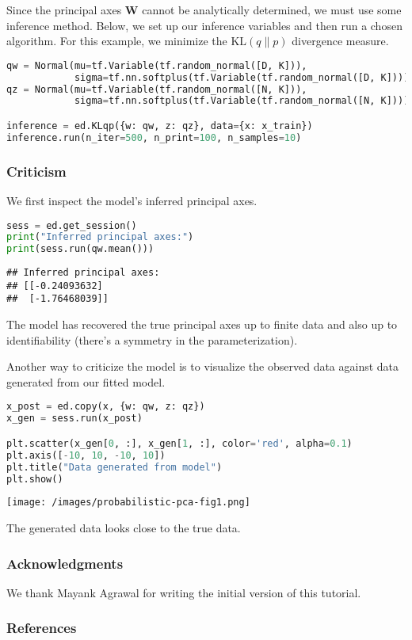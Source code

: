 Since the principal axes $\mathbf{W}$ cannot be analytically
determined, we must use some inference method. Below, we set up our
inference variables and then run a chosen algorithm. For this
example, we minimize the $\text{KL}(q\|p)$ divergence measure.

\begin{lstlisting}[language=Python]
qw = Normal(mu=tf.Variable(tf.random_normal([D, K])),
            sigma=tf.nn.softplus(tf.Variable(tf.random_normal([D, K]))))
qz = Normal(mu=tf.Variable(tf.random_normal([N, K])),
            sigma=tf.nn.softplus(tf.Variable(tf.random_normal([N, K]))))

inference = ed.KLqp({w: qw, z: qz}, data={x: x_train})
inference.run(n_iter=500, n_print=100, n_samples=10)
\end{lstlisting}

\subsubsection{Criticism}

We first inspect the model's inferred principal axes.

\begin{lstlisting}[language=Python]
sess = ed.get_session()
print("Inferred principal axes:")
print(sess.run(qw.mean()))
\end{lstlisting}

\begin{lstlisting}
## Inferred principal axes:
## [[-0.24093632]
##  [-1.76468039]]
\end{lstlisting}

The model has recovered the true principal axes up to finite data and
also up to identifiability (there's a symmetry in the
parameterization).

Another way to criticize the model is to visualize the observed data
against data generated from our fitted model.

\begin{lstlisting}[language=Python]
x_post = ed.copy(x, {w: qw, z: qz})
x_gen = sess.run(x_post)

plt.scatter(x_gen[0, :], x_gen[1, :], color='red', alpha=0.1)
plt.axis([-10, 10, -10, 10])
plt.title("Data generated from model")
plt.show()
\end{lstlisting}

\texttt{[image: /images/probabilistic-pca-fig1.png]}

The generated data looks close to the true data.

\subsubsection{Acknowledgments}

We thank Mayank Agrawal for writing the initial version of this
tutorial.

\subsubsection{References}\label{references}
